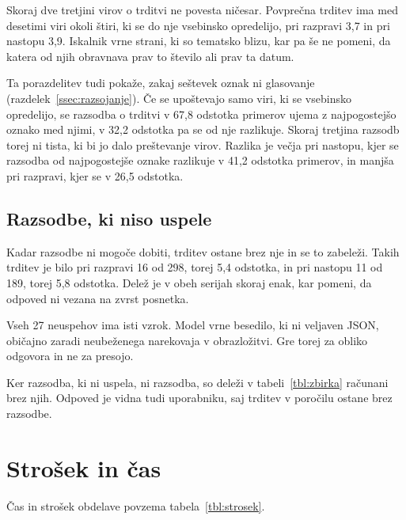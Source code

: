 \documentclass[a4paper, 12pt]{book}
\begin{document}
Skoraj dve tretjini virov o trditvi ne povesta ničesar. Povprečna trditev ima
med desetimi viri okoli štiri, ki se do nje vsebinsko opredelijo, pri razpravi
3,7 in pri nastopu 3,9. Iskalnik vrne strani, ki so tematsko blizu, kar pa še ne pomeni, da katera od
njih obravnava prav to število ali prav ta datum.

Ta porazdelitev tudi pokaže, zakaj seštevek oznak ni glasovanje
(razdelek~\ref{ssec:razsojanje}). Če se upoštevajo samo viri, ki se vsebinsko
opredelijo, se razsodba o trditvi v 67,8 odstotka primerov ujema z
najpogostejšo oznako med njimi, v 32,2 odstotka pa se od nje razlikuje. Skoraj
tretjina razsodb torej ni tista, ki bi jo dalo preštevanje virov. Razlika je
večja pri nastopu, kjer se razsodba od najpogostejše oznake razlikuje v 41,2
odstotka primerov, in manjša pri razpravi, kjer se v 26,5 odstotka. 


\subsection{Razsodbe, ki niso uspele}
\label{ssec:neuspele}

Kadar razsodbe ni mogoče dobiti, trditev ostane brez nje in se to zabeleži.
Takih trditev je bilo pri razpravi 16 od 298, torej 5,4 odstotka, in pri nastopu
11 od 189, torej 5,8 odstotka. Delež je v obeh serijah skoraj enak, kar pomeni,
da odpoved ni vezana na zvrst posnetka.

Vseh 27 neuspehov ima isti vzrok. Model vrne besedilo, ki ni veljaven JSON,
običajno zaradi neubeženega narekovaja v obrazložitvi. Gre torej za obliko odgovora in ne za presojo.

Ker razsodba, ki ni uspela, ni razsodba, so deleži v tabeli~\ref{tbl:zbirka}
računani brez njih. Odpoved je vidna tudi uporabniku, saj trditev v poročilu
ostane brez razsodbe.

\section{Strošek in čas}
\label{sec:strosek-cas}

Čas in strošek obdelave povzema tabela~\ref{tbl:strosek}.
\end{document}
